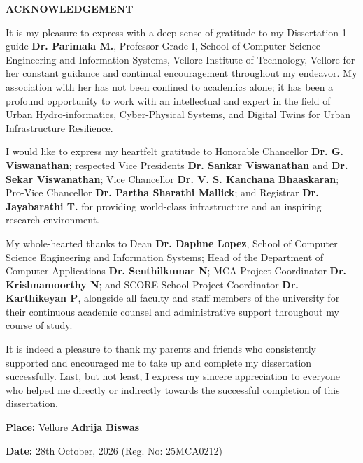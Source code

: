 \thispagestyle{plain}
\begin{center}
    {\fontsize{14pt}{18pt}\selectfont \textbf{ACKNOWLEDGEMENT}\par}
\end{center}
\vspace{0.8cm}

\noindent It is my pleasure to express with a deep sense of gratitude to my Dissertation-1 guide \textbf{Dr. Parimala M.}, Professor Grade I, School of Computer Science Engineering and Information Systems, Vellore Institute of Technology, Vellore for her constant guidance and continual encouragement throughout my endeavor. My association with her has not been confined to academics alone; it has been a profound opportunity to work with an intellectual and expert in the field of Urban Hydro-informatics, Cyber-Physical Systems, and Digital Twins for Urban Infrastructure Resilience.

\vspace{0.5cm}
\noindent I would like to express my heartfelt gratitude to Honorable Chancellor \textbf{Dr. G. Viswanathan}; respected Vice Presidents \textbf{Dr. Sankar Viswanathan} and \textbf{Dr. Sekar Viswanathan}; Vice Chancellor \textbf{Dr. V. S. Kanchana Bhaaskaran}; Pro-Vice Chancellor \textbf{Dr. Partha Sharathi Mallick}; and Registrar \textbf{Dr. Jayabarathi T.} for providing world-class infrastructure and an inspiring research environment.

\vspace{0.5cm}
\noindent My whole-hearted thanks to Dean \textbf{Dr. Daphne Lopez}, School of Computer Science Engineering and Information Systems; Head of the Department of Computer Applications \textbf{Dr. Senthilkumar N}; MCA Project Coordinator \textbf{Dr. Krishnamoorthy N}; and SCORE School Project Coordinator \textbf{Dr. Karthikeyan P}, alongside all faculty and staff members of the university for their continuous academic counsel and administrative support throughout my course of study.

\vspace{0.5cm}
\noindent It is indeed a pleasure to thank my parents and friends who consistently supported and encouraged me to take up and complete my dissertation successfully. Last, but not least, I express my sincere appreciation to everyone who helped me directly or indirectly towards the successful completion of this dissertation.

\vspace{1.5cm}
\noindent \textbf{Place:} Vellore \hfill \textbf{Adrija Biswas}

\vspace{0.2cm}
\noindent \textbf{Date:} 28th October, 2026 \hfill (Reg. No: 25MCA0212)

\clearpage
